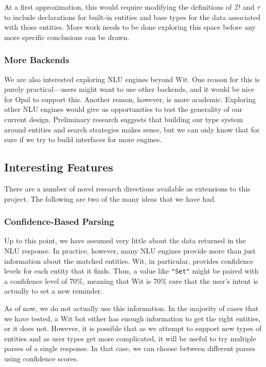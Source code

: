 \documentclass[twocolumn]{article}
\newcommand{\ts}[1]{\texttt{#1}}
\newcommand{\fcy}[1]{\mathcal{#1}}
\begin{document}
At a first approximation, this would require modifying the definitions of
$\fcy{D}$ and $\tau$ to include declarations for built-in entities and
base types for the data associated with those entities. More work needs to be
done exploring this space before any more specific conclusions can be drawn.

\subsubsection{More Backends}
We are also interested exploring NLU engines beyond Wit. One reason for this is
purely practical---users might want to use other backends, and it would be nice
for Opal to support this. Another reason, however, is more academic. Exploring
other NLU engines would give us opportunities to test the generality of our
current design. Preliminary research suggests that building our type system
around entities and search strategies makes sense, but we can only know that for
sure if we try to build interfaces for more engines.

\subsection{Interesting Features}
There are a number of novel research directions available as extensions to this
project. The following are two of the many ideas that we have had.

\subsubsection{Confidence-Based Parsing}
Up to this point, we have assumed very little about the data returned in the NLU
response. In practice, however, many NLU engines provide more than just
information about the matched entities. Wit, in particular, provides confidence
levels for each entity that it finds. Thus, a value like \ts{"Set"} might be
paired with a confidence level of $70\%$, meaning that Wit is $70\%$ sure that
the user's intent is actually to set a new reminder.

As of now, we do not actually use this information. In the majority of cases
that we have tested, a Wit bot either has enough information to get the right
entities, or it does not. However, it is possible that as we attempt to support
new types of entities and as user types get more complicated, it will be useful
to try multiple parses of a single response. In that case, we can choose between
different parses using confidence scores.
\end{document}
